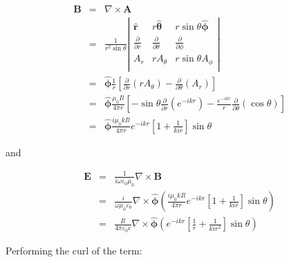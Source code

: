 \documentclass[a4paper,14pt]{extbook}
\begin{document}
\begin{eqnarray} \label{get_B_hd}
\mathbf{B}&=&\nabla \times \mathbf{A} \\
&=&\frac{1}{r^2 \sin \theta}\left|%
\begin{array}{ccc}
 \mathbf{ \hat{r}} & r\mathbf{\hat{\theta}} & r \sin \theta \mathbf{\hat{\phi}} \\
  \frac{\partial }{\partial r} & \frac{\partial }{\partial \theta } & \frac{\partial }{\partial \phi } \\
  A_r & rA_{\theta } & r \sin \theta A_{\phi} \\
\end{array}%
\right|\\
&=&\mathbf{ \hat{\phi}} \frac{1}{r} \left[ \frac{\partial }{\partial r} \left( rA_\theta \right) - \frac{\partial }{\partial \theta } (A_r)\right] \nonumber \\
&=& \mathbf{\hat{\phi}}\frac{\mu_0 I l}{4 \pi r} \left[ -\sin \theta \frac{\partial }{\partial r} \left(   e^{-ikr } \right) - \frac{e^{-ikr }}{r} \frac{\partial }{\partial \theta } (\cos \theta )\right] \nonumber \\
&=& \mathbf{\hat{\phi}} \frac{i \mu_0 k I l}{4 \pi r} e^{-ikr } \left[ 1+ \frac{1}{kir}\right] \sin \theta \nonumber
\end{eqnarray}

and

\begin{eqnarray} \label{get_E_hd}
\mathbf{E}&=& \frac{1}{i\omega \varepsilon_0 \mu_0} \nabla \times \mathbf{B} \\
&=&\frac{i}{ \omega \mu_0 \varepsilon_0} \nabla \times\mathbf{ \hat{\phi}} \left( \frac{i \mu_0 k I l}{4 \pi r} e^{-ikr } \left[ 1+ \frac{1}{kir}\right] \sin \theta \right) \\
&=&\frac{  I l}{4 \pi \varepsilon_0 c} \nabla \times \mathbf{\hat{\phi}} \left( e^{-ikr } \left[  \frac{ 1}{ r}+ \frac{1}{kir^2}\right] \sin \theta \right)
\end{eqnarray}

Performing the curl of the term:
\end{document}
